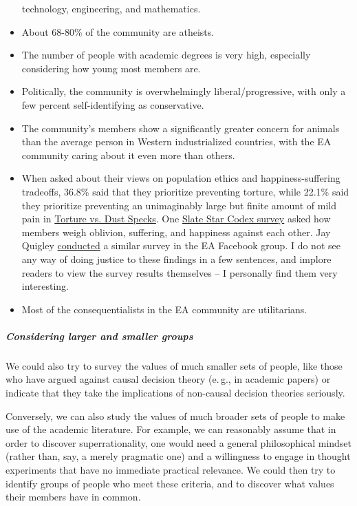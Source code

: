 \begin{itemize}
  technology, engineering, and mathematics.
\item
  About 68-80\% of the community are atheists.
\item
  The number of people with academic degrees is very high, especially
  considering how young most members are.
\item
  Politically, the community is overwhelmingly liberal/progressive, with
  only a few percent self-identifying as conservative.
\item
  The community's members show a significantly greater concern for
  animals than the average person in Western industrialized countries,
  with the EA community caring about it even more than others.
\item
  When asked about their views on population ethics and
  happiness-suffering tradeoffs, 36.8\% said that they prioritize
  preventing torture, while 22.1\% said they prioritize preventing an
  unimaginably large but finite amount of mild pain in
  \href{http://lesswrong.com/lw/kn/torture_vs_dust_specks/}{Torture
  vs. Dust Specks}. One
  \href{http://slatestarcodex.com/2016/06/28/survey-results-suffering-vs-oblivion/}{Slate
  Star Codex survey} asked how members weigh oblivion, suffering, and
  happiness against each other. Jay Quigley
  \href{https://www.facebook.com/groups/effective.altruists/permalink/1117549958301360/}{conducted}
  a similar survey in the EA Facebook group. I do not see any way of
  doing justice to these findings in a few sentences, and implore
  readers to view the survey results themselves -- I personally find
  them very interesting.
\item
  Most of the consequentialists in the EA community are utilitarians.
\end{itemize}

\subparagraph{Considering larger and smaller
groups}\label{considering-larger-and-smaller-groups}

We could also try to survey the values of much smaller sets of people,
like those who have argued against causal decision theory (e.\,g., in
academic papers) or indicate that they take the implications of
non-causal decision theories seriously.

Conversely, we can also study the values of much broader sets of people
to make use of the academic literature. For example, we can reasonably
assume that in order to discover superrationality, one would need a
general philosophical mindset (rather than, say, a merely pragmatic one)
and a willingness to engage in thought experiments that have no
immediate practical relevance. We could then try to identify groups of
people who meet these criteria, and to discover what values their
members have in common.

